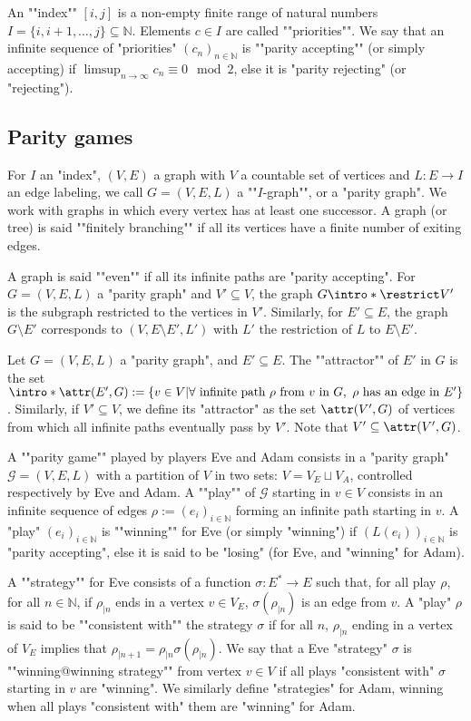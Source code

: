 \documentclass[a4paper,UKenglish,cleveref, autoref, thm-restate]{lipics-v2021}
\newcommand{\NN}{\mathbb{N}}
\newcommand{\G}{\mathcal{G}}
\begin{document}
\AP An ""index"" $[i,j]$ is a non-empty finite range of natural numbers $I = \{i, i+1,\dots, j\} \subseteq \NN$.
Elements $c \in I$ are called ""priorities"". We say that an infinite sequence of "priorities" $(c_n)_{n\in \NN}$ is ""parity accepting"" (or simply \reintro*accepting) if $\limsup_{n \to \infty} c_n \equiv 0 \mod 2$, else it is "parity rejecting" (or "rejecting").


\subsection{Parity games}
\AP For $I$ an "index", $(V,E)$ a graph with $V$ a countable set of vertices and $L:E\to I$ an edge labeling, we call $G = (V,E,L)$ a ""$I$-graph"", or a "parity graph". We work with graphs in which every vertex has at least one successor. 
A graph (or tree) is said ""finitely branching"" if all its vertices have a finite number of exiting edges.

A graph is said ""even"" if all its infinite paths are "parity accepting".
For $G=(V,E,L)$ a "parity graph" and $V' \subseteq V$, the graph $G \intro*\restrict V'$ is the subgraph restricted to the vertices in $V'$. Similarly, for $E' \subseteq E$, the graph $G \setminus E'$ corresponds to $(V,E\setminus E', L')$ with $L'$ the restriction of $L$ to $E\setminus E'$.

\AP Let $G = (V,E,L)$ a "parity graph", and $E' \subseteq E$. The ""attractor"" of $E'$ in $G$ is the set
$\intro*\attr(E',G) := \{v\in V|\forall \text{ infinite path } \rho \text{ from } v \text { in }G,\ \rho \text{ has an edge in } E'\}$. Similarly, if $V' \subseteq V$, we define its "attractor" as the set $\attr(V',G)$ of vertices from which all infinite paths eventually pass by $V'$. Note that $V' \subseteq \attr(V',G)$.

\AP A ""parity game"" played by players Eve and Adam consists in a "parity graph" $\G = (V,E,L)$ with a partition of $V$ in two sets: $V = V_E \sqcup V_A$, controlled respectively by Eve and Adam. A ""play"" of $\G$ starting in $v\in V$ consists in an infinite sequence of edges $\rho := (e_i)_{i\in \NN}$ forming an infinite path starting in $v$. 
A "play" $(e_i)_{i\in \NN}$ is ""winning"" for Eve (or simply "winning") if $(L(e_i))_{i\in \NN}$ is "parity accepting", else it is said to be "losing" (for Eve, and "winning" for Adam).

\AP A ""strategy"" for Eve consists of a function $\sigma : E^* \to E$ such that, for all play $\rho$, for all $n \in \NN$, if $\rho_{|n}$ ends in a vertex $v \in V_E$, $\sigma(\rho_{|n})$ is an edge from $v$. A "play" $\rho$ is said to be ""consistent with"" the strategy $\sigma$ if for all $n$, $\rho_{|n}$ ending in a vertex of $V_E$ implies that $\rho_{|n+1} = \rho_{|n}\sigma(\rho_{|n})$. 
We say that a Eve "strategy" $\sigma$ is ""winning@winning strategy"" from vertex $v\in V$ if all plays "consistent with" $\sigma$ starting in $v$ are "winning". We similarly define "strategies" for Adam, winning when all plays "consistent with" them are "winning" for Adam.
\end{document}
